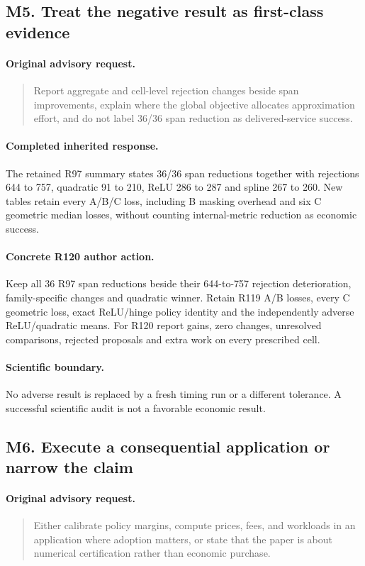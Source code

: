 \subsection{M5. Treat the negative result as first-class evidence}
\label{response120:M5}
\paragraph{Original advisory request.}
\begin{quote}
Report aggregate and cell-level rejection changes beside span improvements, explain where the global objective allocates approximation effort, and do not label 36/36 span reduction as delivered-service success.
\end{quote}
\paragraph{Completed inherited response.}
The retained R97 summary states 36/36 span reductions together with rejections 644 to 757, quadratic 91 to 210, ReLU 286 to 287 and spline 267 to 260. New tables retain every A/B/C loss, including B masking overhead and six C geometric median losses, without counting internal-metric reduction as economic success.
\paragraph{Concrete R120 author action.}
Keep all 36 R97 span reductions beside their 644-to-757 rejection deterioration, family-specific changes and quadratic winner. Retain R119 A/B losses, every C geometric loss, exact ReLU/hinge policy identity and the independently adverse ReLU/quadratic means. For R120 report gains, zero changes, unresolved comparisons, rejected proposals and extra work on every prescribed cell.
\paragraph{Scientific boundary.}
No adverse result is replaced by a fresh timing run or a different tolerance. A successful scientific audit is not a favorable economic result.

\subsection{M6. Execute a consequential application or narrow the claim}
\label{response120:M6}
\paragraph{Original advisory request.}
\begin{quote}
Either calibrate policy margins, compute prices, fees, and workloads in an application where adoption matters, or state that the paper is about numerical certification rather than economic purchase.
\end{quote}
